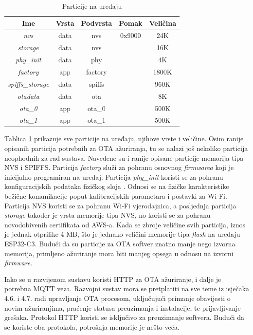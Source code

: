 \begin{table}[ht!]
	\centering
	\caption{Particije na uređaju}
	\begin{tabular}{|c| c| c| c| c|}
		\hline
		\rowcolor{lightblue}  
		\textbf{Ime} & \textbf{Vrsta} & \textbf{Podvrsta} & \textbf{Pomak} & \textbf{Veličina} \\ \hline
		\textit{nvs} & data & nvs & 0x9000 & 24K \\ \hline
		\textit{storage} & data & nvs &   & 16K \\ \hline
		\textit{phy\_init} & data & phy &   & 4K \\ \hline
		\textit{factory} & app & factory &   & 1800K \\ \hline
		\textit{spiffs\_storage} & data & spiffs &   & 960K \\ \hline
		\textit{otadata} & data & ota &   & 8K \\ \hline
		\textit{ota\_0} & app & ota\_0 &   & 500K \\ \hline
		\textit{ota\_1} & app & ota\_1 &   & 500K \\ \hline
	\end{tabular}
	\label{table:partitions}
\end{table}

Tablica \ref{table:partitions} prikazuje sve particije na uređaju, njihove vrste i veličine. Osim ranije opisanih particija potrebnih za OTA ažuriranja, tu se nalazi još nekoliko particija neophodnih za rad sustava. Navedene su i ranije opisane particije memorija tipa NVS i SPIFFS. Particija \textit{factory} služi za pohranu osnovnog \textit{firmwarea} koji je inicijalno programiran na uređaj. Particija \textit{phy\_init} koristi se za pohranu konfiguracijskih podataka fizičkog sloja . Odnosi se na fizičke karakteristike bežične komunikacije poput kalibracijskih parametara i postavki za Wi-Fi. Particija NVS koristi se za pohranu Wi-Fi vjerodajnica, a posljednja particija \textit{storage} također je vrsta memorije tipa NVS, no koristi se za pohranu novodobivenih certifikata od AWS-a. Kada se zbroje veličine svih particija, iznos je jednak otprilike 4 MB, što je jednako veličini memorije tipa \textit{flash} na uređaju ESP32-C3. Budući da su particije za OTA softver znatno manje nego izvorna memorija, primljeno ažuriranje mora biti manjeg opsega u odnosu na izvorni \textit{firmware}.

Iako se u razvijenom sustavu koristi HTTP za OTA ažuriranje, i dalje je potrebna MQTT veza. Razvojni sustav mora se pretplatiti na sve teme iz isječaka 4.6. i 4.7. radi  upravljanje OTA procesom, uključujući primanje obavijesti o novim ažuriranjima, praćenje statusa preuzimanja i instalacije, te prijavljivanje grešaka. Protokol HTTP koristi se isključivo za preuzimanje softvera. Budući da se koriste oba protokola, potrošnja memorije je nešto veća.

